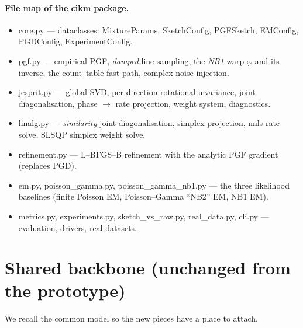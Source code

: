 \documentclass[11pt]{article}
\newcommand{\code}[1]{\texttt{\small #1}}
\def\code#1{#1}%
\def\small{}%
\theoremstyle{definition}
\begin{document}
\paragraph{File map of the \code{cikm} package.}
\begin{itemize}[leftmargin=2em, itemsep=1pt]
  \item \code{core.py} --- dataclasses: \code{MixtureParams}, \code{SketchConfig},
        \code{PGFSketch}, \code{EMConfig}, \code{PGDConfig}, \code{ExperimentConfig}.
  \item \code{pgf.py} --- empirical PGF, \emph{damped} line sampling, the \emph{NB1} warp
        $\varphi$ and its inverse, the count--table fast path, complex noise injection.
  \item \code{jesprit.py} --- global SVD, per-direction rotational invariance, joint
        diagonalisation, phase $\to$ rate projection, weight system, diagnostics.
  \item \code{linalg.py} --- \emph{similarity} joint diagonalisation, simplex projection,
        \code{nnls} rate solve, SLSQP simplex weight solve.
  \item \code{refinement.py} --- L--BFGS--B refinement with the analytic PGF gradient
        (replaces PGD).
  \item \code{em.py}, \code{poisson\_gamma.py}, \code{poisson\_gamma\_nb1.py} --- the three
        likelihood baselines (finite Poisson EM, Poisson--Gamma ``NB2'' EM, NB1 EM).
  \item \code{metrics.py}, \code{experiments.py}, \code{sketch\_vs\_raw.py},
        \code{real\_data.py}, \code{cli.py} --- evaluation, drivers, real datasets.
\end{itemize}

\section{Shared backbone (unchanged from the prototype)}

We recall the common model so the new pieces have a place to attach.
\end{document}
